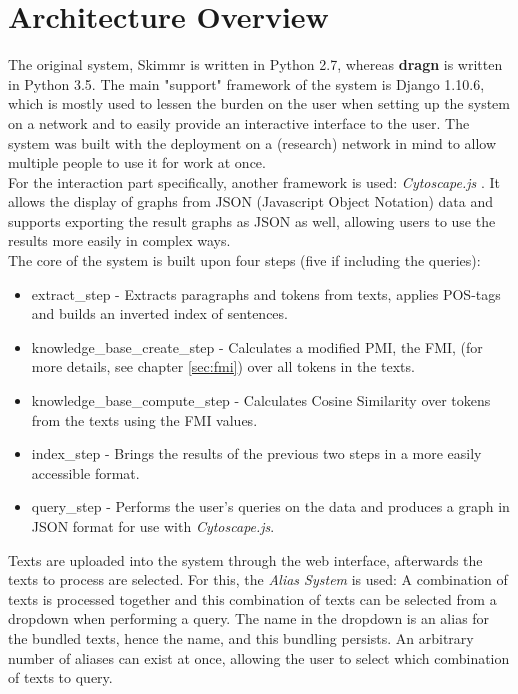 \section{Architecture Overview}\label{overview}
The original system, Skimmr \cite{novavcek2014skimmr} is written in Python 2.7, whereas \textbf{dragn} is written in Python 3.5. The main "support" framework of the system is Django 1.10.6, which is mostly used to lessen the burden on the user when setting up the system on a network and to easily provide an interactive interface to the user. The system was built with the deployment on a (research) network in mind to allow multiple people to use it for work at once.\\
For the interaction part specifically, another framework is used: \textit{Cytoscape.js} \cite{doi:10.1093/bioinformatics/btv557}. It allows the display of graphs from JSON (Javascript Object Notation) data and supports exporting the result graphs as JSON as well, allowing users to use the results more easily in complex ways.\\
The core of the system is built upon four steps (five if including the queries):
\begin{itemize}
    \item extract\_step - Extracts paragraphs and tokens from texts, applies POS-tags and builds an inverted index of sentences.
    \item knowledge\_base\_create\_step - Calculates a modified PMI, the FMI, (for more details, see chapter \ref{sec:fmi}) over all tokens in the texts.
    \item knowledge\_base\_compute\_step - Calculates Cosine Similarity over tokens from the texts using the FMI values.
    \item index\_step - Brings the results of the previous two steps in a more easily accessible format.
    \item query\_step - Performs the user's queries on the data and produces a graph in JSON format for use with \textit{Cytoscape.js}.
\end{itemize}
Texts are uploaded into the system through the web interface, afterwards the texts to process are selected. For this, the \textit{Alias System} is used: A combination of texts is processed together and this combination of texts can be selected from a dropdown when performing a query. The name in the dropdown is an alias for the bundled texts, hence the name, and this bundling persists. An arbitrary number of aliases can exist at once, allowing the user to select which combination of texts to query.\\
